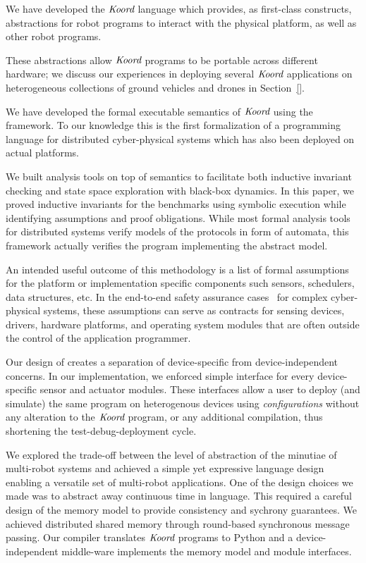 \begin{noinditem}

\item  {We have developed the $\emph{Koord}$ language which provides, as first-class constructs,  abstractions for robot  programs to interact with the physical platform, as well as other robot programs.}
\item These abstractions allow $\emph{Koord}$ programs to be portable across different hardware;
      we discuss our experiences in deploying several $\emph{Koord}$ applications on heterogeneous collections of ground vehicles and drones in Section~\ref{}.
\item  We have developed the formal executable semantics of $\emph{Koord}$ using the \K framework. To our knowledge this is the first formalization of a programming language for distributed cyber-physical systems which has also been deployed on actual platforms.
\item  We built analysis tools on top of semantics to facilitate both inductive invariant checking and state space exploration with black-box dynamics. In this paper, we proved inductive invariants for the benchmarks using symbolic execution while identifying assumptions and proof obligations. While most formal analysis tools for distributed systems verify models of the protocols in form of automata, this framework actually verifies the program implementing the abstract model.
\item An intended useful outcome of this methodology is a list of formal assumptions for the platform or implementation specific components such sensors, schedulers, data structures, etc. In the end-to-end safety assurance cases~\cite{} for complex cyber-physical systems, these assumptions can serve as contracts for sensing devices, drivers, hardware platforms, and operating system modules that are often outside the control of the application programmer.
\item Our design of \lgname creates a separation of device-specific from device-independent concerns. In our implementation, we enforced simple interface for every device-specific sensor and actuator modules. These interfaces allow a user to deploy (and simulate) the same program on heterogenous devices using \emph{configurations} without any alteration to the $\emph{Koord}$ program, or any additional compilation, thus shortening the test-debug-deployment cycle.
\item We explored the trade-off between the level of abstraction of the minutiae of multi-robot systems and achieved a simple yet expressive language design enabling a versatile set of multi-robot applications. One of the design choices we made was to abstract away continuous time in language. This required a careful design of the memory model to provide consistency and sychrony guarantees. We achieved distributed shared memory through round-based synchronous message passing. Our compiler translates $\emph{Koord}$ programs to Python and a device-independent middle-ware implements the memory model and module interfaces.

\end{noinditem}
